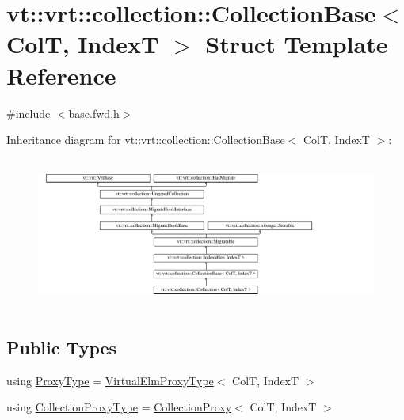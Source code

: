 \hypertarget{structvt_1_1vrt_1_1collection_1_1_collection_base}{}\section{vt\+:\+:vrt\+:\+:collection\+:\+:Collection\+Base$<$ ColT, IndexT $>$ Struct Template Reference}
\label{structvt_1_1vrt_1_1collection_1_1_collection_base}


{\ttfamily \#include $<$base.\+fwd.\+h$>$}

Inheritance diagram for vt\+:\+:vrt\+:\+:collection\+:\+:Collection\+Base$<$ ColT, IndexT $>$\+:\begin{figure}[H]
\begin{center}
\leavevmode
\includegraphics[height=5.028059cm]{structvt_1_1vrt_1_1collection_1_1_collection_base}
\end{center}
\end{figure}
\subsection*{Public Types}
\begin{DoxyCompactItemize}
\item 
using \hyperlink{structvt_1_1vrt_1_1collection_1_1_collection_base_a0c2fd2443732bebc963f6278b7ba089b}{Proxy\+Type} = \hyperlink{namespacevt_1_1vrt_a620a5c8c59d13e513f690c74b4af516f}{Virtual\+Elm\+Proxy\+Type}$<$ ColT, IndexT $>$
\item 
using \hyperlink{structvt_1_1vrt_1_1collection_1_1_collection_base_af40b40a2ee128748bcb917f14a0152b4}{Collection\+Proxy\+Type} = \hyperlink{structvt_1_1vrt_1_1collection_1_1_collection_proxy}{Collection\+Proxy}$<$ ColT, IndexT $>$
\end{DoxyCompactItemize}
